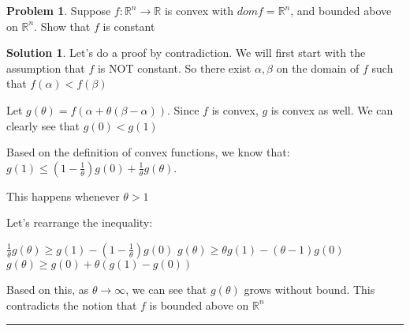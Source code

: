 \documentclass{article}
\theoremstyle{definition}
\newtheorem{problem}{Problem}
\def\fline{\rule{0.75\linewidth}{0.5pt}}
\newcommand{\finishline}{\begin{center}\fline\end{center}}
\newtheorem*{solution*}{Solution}
\newenvironment{solution}{\begin{solution*}}{{\finishline} \end{solution*}}
\begin{document}
\begin{problem}
    Suppose $f: \mathbb{R}^n \rightarrow \mathbb{R}$ is convex with $dom f = \mathbb{R}^n$, and bounded above on $\mathbb{R}^n$. Show that $f$ is constant

    \begin{solution}
        Let's do a proof by contradiction. We will first start with the assumption that $f$ is NOT constant. So there exist $\alpha, \beta$ on the domain of $f$ such that $f(\alpha) < f(\beta)$ \newline 

        Let $g(\theta) = f(\alpha + \theta(\beta - \alpha))$. Since $f$ is convex, $g$ is convex as well. We can clearly see that $g(0) < g(1)$ \newline 

        Based on the definition of convex functions, we know that: \newline 
        $g(1) \leq (1 - \frac{1}{\theta}) g(0) + \frac{1}{\theta} g(\theta)$. 

        This happens whenever $\theta > 1$ \newline 

        Let's rearrange the inequality: \newline 

        $\frac{1}{\theta} g(\theta) \geq g(1) - (1 - \frac{1}{\theta}) g(0)$ \newline 
        $g(\theta) \geq \theta g(1) - (\theta - 1) g(0)$ \newline 
        $g(\theta) \geq g(0) + \theta (g(1) - g(0))$ \newline 


        Based on this, as $\theta \rightarrow \infty$, we can see that $g(\theta)$ grows without bound. This contradicts the notion that $f$ is bounded above on $\mathbb{R}^n$
        
        
    \end{solution}  
\end{problem}
\end{document}
